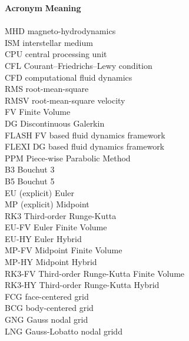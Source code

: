 \begin{tabbing}
\textbf{Acronym}    \hspace{2cm}\=\textbf{Meaning} \\\\

MHD             \> magneto-hydrodynamics \\
ISM             \> interstellar medium \\
CPU             \> central processing unit \\
CFL             \> Courant–Friedrichs–Lewy condition \\
CFD             \> computational fluid dynamics \\
RMS             \> root-mean-square \\
RMSV            \> root-mean-square velocity \\
FV              \> Finite Volume \\
DG              \> Discontinuous Galerkin \\
FLASH           \> FV based fluid dynamics framework \\
FLEXI           \> DG based fluid dynamics framework \\
PPM             \> Piece-wise Parabolic Method \\
B3              \> Bouchut 3 \\
B5              \> Bouchut 5 \\
EU              \> (explicit) Euler \\
MP              \> (explicit) Midpoint \\
RK3             \> Third-order Runge-Kutta \\
EU-FV           \> Euler Finite Volume \\
EU-HY           \> Euler Hybrid \\
MP-FV           \> Midpoint Finite Volume \\
MP-HY           \> Midpoint Hybrid \\
RK3-FV          \> Third-order Runge-Kutta Finite Volume \\
RK3-HY          \> Third-order Runge-Kutta Hybrid \\
FCG             \> face-centered grid \\
BCG             \> body-centered grid \\
GNG             \> Gauss nodal grid \\
LNG             \> Gauss-Lobatto nodal gridd \\

\end{tabbing}
\newpage
